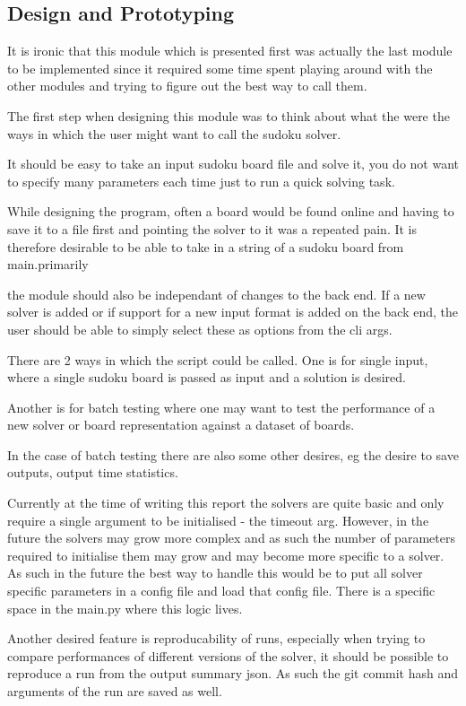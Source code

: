 \documentclass[11pt]{article}
\begin{document}
\subsection{Design and Prototyping}
It is ironic that this module which is presented first was actually the last module to be implemented since it required some time spent playing around with the other modules and trying to figure out the best way to call them.

The first step when designing this module was to think about what the were the ways in which the user might want to call the sudoku solver. 

It should be easy to take an input sudoku board file and solve it, you do not want to specify many parameters each time just to run a quick solving task. 

While designing the program, often a board would be found online and having to save it to a file first and pointing the solver to it was a repeated pain. It is therefore desirable to be able to take in a string of a sudoku board from main.primarily

the module should also be independant of changes to the back end. If a new solver is added or if support for a new input format is added on the back end, the user should be able to simply select these as options from the cli args.

There are 2 ways in which the script could be called. One is for single input, where a single sudoku board is passed as input and a solution is desired.

Another is for batch testing where one may want to test the performance of a new solver or board representation against a dataset of boards.

In the case of batch testing there are also some other desires, eg the desire to save outputs, output time statistics. 

Currently at the time of writing this report the solvers are quite basic and only require a single argument to be initialised - the timeout arg. However, in the future the solvers may grow more complex and as such the number of parameters required to initialise them may grow and may become more specific to a solver. As such in the future the best way to handle this would be to put all solver specific parameters in a config file and load that config file. There is a specific space in the main.py where this logic lives. 

Another desired feature is reproducability of runs, especially when trying to compare performances of different versions of the solver, it should be possible to reproduce a run from the output summary json. As such the git commit hash and arguments of the run are saved as well.
\end{document}
